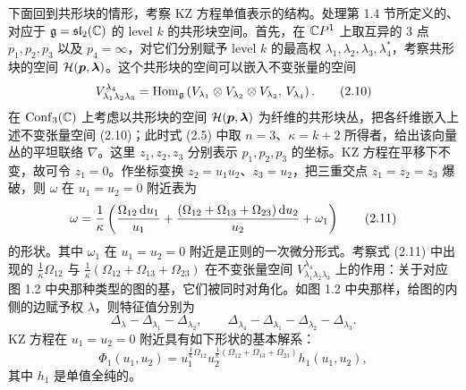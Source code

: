 下面回到共形块的情形，考察 KZ 方程单值表示的结构。处理第 1.4 节所定义的、对应于 $\mathfrak{g}=\mathfrak{sl}_2(\mathbb{C})$ 的 level $k$ 的共形块空间。首先，在 $\mathbb{C}P^1$ 上取互异的 3 点 $p_1,p_2,p_3$ 以及 $p_4=\infty$，对它们分别赋予 level $k$ 的最高权 $\lambda_1,\lambda_2,\lambda_3,\lambda_4^*$，考察共形块的空间 $\mathcal{H}(\bm{p},\bm{\lambda})$。这个共形块的空间可以嵌入不变张量的空间
\begin{equation}
  V^{\lambda_4}_{\lambda_1\lambda_2\lambda_3}
  =\operatorname{Hom}_{\mathfrak{g}}\left(V_{\lambda_1}\otimes V_{\lambda_2}\otimes V_{\lambda_3},\,V_{\lambda_4}\right). \tag{2.10}
\end{equation}
在 $\operatorname{Conf}_3(\mathbb{C})$ 上考虑以共形块的空间 $\mathcal{H}(\bm{p},\bm{\lambda})$ 为纤维的共形块丛，把各纤维嵌入上述不变张量空间 (2.10)；此时式 (2.5) 中取 $n=3$、$\kappa=k+2$ 所得者，给出该向量丛的平坦联络 $\nabla$。这里 $z_1,z_2,z_3$ 分别表示 $p_1,p_2,p_3$ 的坐标。KZ 方程在平移下不变，故可令 $z_1=0$。作坐标变换 $z_2=u_1u_2$、$z_3=u_2$，把三重交点 $z_1=z_2=z_3$ 爆破，则 $\omega$ 在 $u_1=u_2=0$ 附近表为
\begin{equation}
  \omega=\frac{1}{\kappa}\left(
  \frac{\Omega_{12}\,\mathrm{d} u_1}{u_1}
  +\frac{(\Omega_{12}+\Omega_{13}+\Omega_{23})\,\mathrm{d} u_2}{u_2}
  +\omega_1\right) \tag{2.11}
\end{equation}
的形状。其中 $\omega_1$ 在 $u_1=u_2=0$ 附近是正则的一次微分形式。考察式 (2.11) 中出现的 $\frac{1}{\kappa}\Omega_{12}$ 与 $\frac{1}{\kappa}(\Omega_{12}+\Omega_{13}+\Omega_{23})$ 在不变张量空间 $V^{\lambda_4}_{\lambda_1\lambda_2\lambda_3}$ 上的作用：关于对应图 1.2 中央那种类型的图的基，它们被同时对角化。如图 1.2 中央那样，给图的内侧的边赋予权 $\lambda$，则特征值分别为
\begin{equation}
  \Delta_\lambda-\Delta_{\lambda_1}-\Delta_{\lambda_2},\qquad
  \Delta_{\lambda_4}-\Delta_{\lambda_1}-\Delta_{\lambda_2}-\Delta_{\lambda_3}. \tag{2.12}
\end{equation}
KZ 方程在 $u_1=u_2=0$ 附近具有如下形状的基本解系：
\begin{equation}
  \Phi_1(u_1,u_2)
  =u_1^{\frac{1}{\kappa}\Omega_{12}}
  u_2^{\frac{1}{\kappa}(\Omega_{12}+\Omega_{13}+\Omega_{23})}
  h_1(u_1,u_2), \tag{2.13}
\end{equation}
其中 $h_1$ 是单值全纯的。


